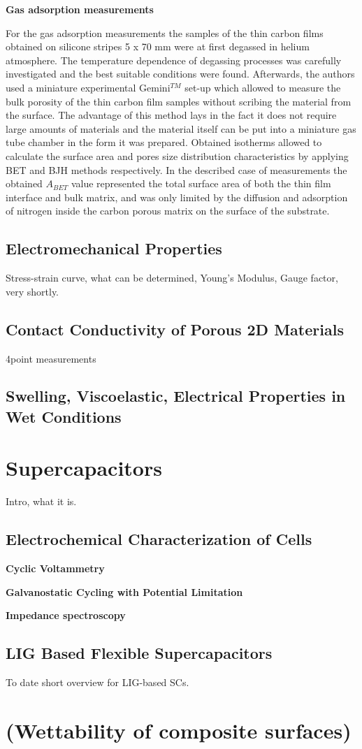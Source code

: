 \medskip
\textbf{Gas adsorption measurements}

For the gas adsorption measurements the samples of the thin carbon films obtained on silicone stripes 5 x 70 mm were at first degassed in helium atmosphere. The temperature dependence of degassing processes was carefully investigated and the best suitable conditions were found. Afterwards, the authors used a miniature experimental Gemini$^{TM}$ set-up which allowed to measure the bulk porosity of the thin carbon film samples without scribing the material from the surface. The advantage of this method lays in the fact it does not require large amounts of materials and the material itself can be put into a miniature gas tube chamber in the form it was prepared.  Obtained isotherms allowed to calculate the surface area and pores size distribution characteristics by applying BET and BJH methods respectively. In the described case of measurements the obtained $A_{BET}$ value represented the total surface area of both the thin film interface and bulk matrix, and was only limited by the diffusion and adsorption of nitrogen inside the carbon porous matrix on the surface of the substrate. 

\subsection{Electromechanical Properties}
Stress-strain curve, what can be determined, Young's Modulus, Gauge factor, very shortly.

\subsection{Contact Conductivity of Porous 2D Materials}
4point measurements




\subsection{Swelling, Viscoelastic, Electrical Properties in Wet Conditions}

\section{Supercapacitors}
Intro, what it is.

\subsection{Electrochemical Characterization of Cells}

\textbf{Cyclic Voltammetry}

\textbf{Galvanostatic Cycling with Potential Limitation}

\textbf{Impedance spectroscopy}

\subsection{LIG Based Flexible Supercapacitors}
To date short overview for LIG-based SCs.


\section{(Wettability of composite surfaces)}
